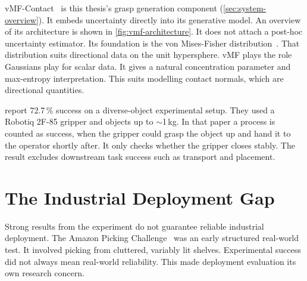 \documentclass[oneside,studentpaper]{wbk}
\begin{document}
vMF-Contact~\cite{shi2025} is this thesis's grasp generation component (\cref{sec:system-overview}). It embeds uncertainty directly into its generative model. An overview of its architecture is shown in \cref{fig:vmf-architecture}. It does not attach a post-hoc uncertainty estimator. Its foundation is the von Mises-Fisher distribution~\cite{fisher1953dispersion}. That distribution suits directional data on the unit hypersphere. vMF plays the role Gaussians play for scalar data. It gives a natural concentration parameter and max-entropy interpretation. This suits modelling contact normals, which are directional quantities.




\cite{shi2025} report 72.7\,\% success on a diverse-object experimental setup. They used a Robotiq 2F-85 gripper and objects up to $\sim$1\,kg. In that paper a process is counted as success, when the gripper could grasp the object up and hand it to the operator shortly after. It only checks whether the gripper closes stably. The result excludes downstream task success such as transport and placement.

\section{The Industrial Deployment Gap}
\label{sec:industrial-deployment-gap}

Strong results from the experiment do not guarantee reliable industrial deployment. The Amazon Picking Challenge~\cite{correll2016analysis} was an early structured real-world test. It involved picking from cluttered, variably lit shelves. Experimental success did not always mean real-world reliability. This made deployment evaluation its own research concern.
\end{document}
